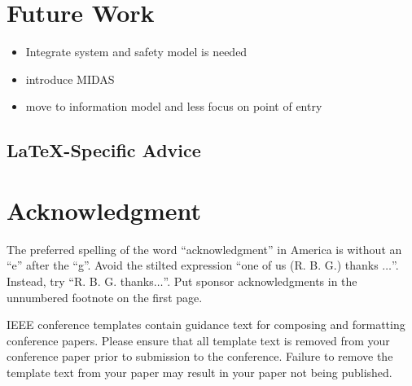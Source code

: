 \documentclass[conference]{IEEEtran}
\begin{document}
\section{Future Work}

\begin{itemize}
\item Integrate system and safety model is needed 
\item introduce MIDAS
\item move to information model and less focus on point of entry 
\end{itemize}
\subsection{\LaTeX-Specific Advice}

\section*{Acknowledgment}

The preferred spelling of the word ``acknowledgment'' in America is without 
an ``e'' after the ``g''. Avoid the stilted expression ``one of us (R. B. 
G.) thanks $\ldots$''. Instead, try ``R. B. G. thanks$\ldots$''. Put sponsor 
acknowledgments in the unnumbered footnote on the first page.




\vspace{12pt}
\color{red}

IEEE conference templates contain guidance text for composing and formatting
conference papers. Please ensure that all template text is removed from your
conference paper prior to submission to the conference. Failure to remove the
template text from your paper may result in your paper not being published.

\end{document}
